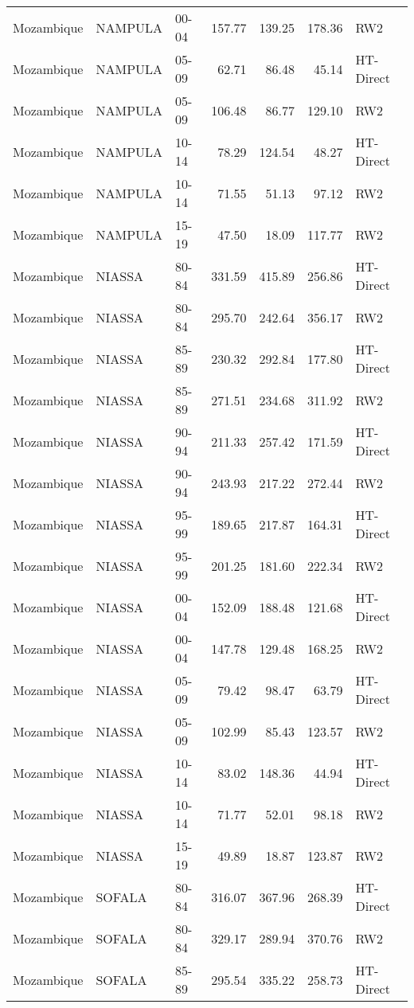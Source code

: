 \begin{longtable}{lllrrrl}
  Mozambique & NAMPULA & 00-04 & 157.77 & 139.25 & 178.36 & RW2 \\ 
  Mozambique & NAMPULA & 05-09 & 62.71 & 86.48 & 45.14 & HT-Direct \\ 
  Mozambique & NAMPULA & 05-09 & 106.48 & 86.77 & 129.10 & RW2 \\ 
  Mozambique & NAMPULA & 10-14 & 78.29 & 124.54 & 48.27 & HT-Direct \\ 
  Mozambique & NAMPULA & 10-14 & 71.55 & 51.13 & 97.12 & RW2 \\ 
  Mozambique & NAMPULA & 15-19 & 47.50 & 18.09 & 117.77 & RW2 \\ 
  Mozambique & NIASSA & 80-84 & 331.59 & 415.89 & 256.86 & HT-Direct \\ 
  Mozambique & NIASSA & 80-84 & 295.70 & 242.64 & 356.17 & RW2 \\ 
  Mozambique & NIASSA & 85-89 & 230.32 & 292.84 & 177.80 & HT-Direct \\ 
  Mozambique & NIASSA & 85-89 & 271.51 & 234.68 & 311.92 & RW2 \\ 
  Mozambique & NIASSA & 90-94 & 211.33 & 257.42 & 171.59 & HT-Direct \\ 
  Mozambique & NIASSA & 90-94 & 243.93 & 217.22 & 272.44 & RW2 \\ 
  Mozambique & NIASSA & 95-99 & 189.65 & 217.87 & 164.31 & HT-Direct \\ 
  Mozambique & NIASSA & 95-99 & 201.25 & 181.60 & 222.34 & RW2 \\ 
  Mozambique & NIASSA & 00-04 & 152.09 & 188.48 & 121.68 & HT-Direct \\ 
  Mozambique & NIASSA & 00-04 & 147.78 & 129.48 & 168.25 & RW2 \\ 
  Mozambique & NIASSA & 05-09 & 79.42 & 98.47 & 63.79 & HT-Direct \\ 
  Mozambique & NIASSA & 05-09 & 102.99 & 85.43 & 123.57 & RW2 \\ 
  Mozambique & NIASSA & 10-14 & 83.02 & 148.36 & 44.94 & HT-Direct \\ 
  Mozambique & NIASSA & 10-14 & 71.77 & 52.01 & 98.18 & RW2 \\ 
  Mozambique & NIASSA & 15-19 & 49.89 & 18.87 & 123.87 & RW2 \\ 
  Mozambique & SOFALA & 80-84 & 316.07 & 367.96 & 268.39 & HT-Direct \\ 
  Mozambique & SOFALA & 80-84 & 329.17 & 289.94 & 370.76 & RW2 \\ 
  Mozambique & SOFALA & 85-89 & 295.54 & 335.22 & 258.73 & HT-Direct \\ 

\end{longtable}
